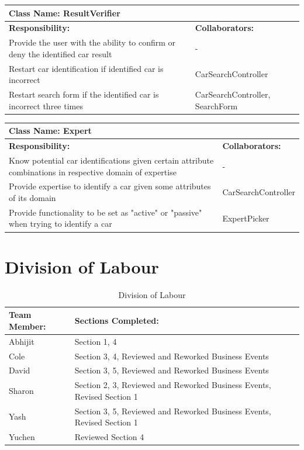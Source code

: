 \documentclass[12pt]{article}
\begin{document}
	\begin{table}[ht]
		\centering
		\begin{tabular}{|p{5cm}|p{5cm}|}
			\hline
			\multicolumn{2}{|l|}{\textbf{Class Name:} ResultVerifier} \\
			\hline
			\textbf{Responsibility:} & \textbf{Collaborators:} \\
			\hline
			Provide the user with the ability to confirm or deny the identified car result & -\\
			\hline
			Restart car identification if identified car is incorrect & CarSearchController\\
			\hline
			Restart search form if the identified car is incorrect three times & CarSearchController, SearchForm\\
			\hline
		\end{tabular}
	\end{table}

	\begin{table}[ht]
		\centering
		\begin{tabular}{|p{5cm}|p{5cm}|}
			\hline
			\multicolumn{2}{|l|}{\textbf{Class Name:} Expert} \\
			\hline
			\textbf{Responsibility:} & \textbf{Collaborators:} \\
			\hline
			Know potential car identifications given certain attribute combinations in respective domain of expertise & -\\
			\hline
			Provide expertise to identify a car given some attributes of its domain & CarSearchController\\
			\hline
			Provide functionality to be set as "active" or "passive" when trying to identify a car & ExpertPicker\\
			\hline
		\end{tabular}
	\end{table}

\FloatBarrier
\appendix
\section{Division of Labour}
\label{sec:division_of_labour}
\begin{table}[ht]
	\centering
	\begin{tabular}{|p{5cm}|p{5cm}|}
		\hline
		\textbf{Team Member:} & \textbf{Sections Completed:}\\
		\hline
		Abhijit & Section 1, 4\\
		\hline
		Cole & Section 3, 4, Reviewed and Reworked Business Events\\
		\hline
		David & Section 3, 5, Reviewed and Reworked Business Events\\
		\hline
		Sharon & Section 2, 3, Reviewed and Reworked Business Events, Revised Section 1\\
		\hline
		Yash & Section 3, 5, Reviewed and Reworked Business Events, Revised Section 1\\
		\hline
		Yuchen & Reviewed Section 4\\
		\hline
	\end{tabular}
	\caption{Division of Labour}
	\label{table:1}
\end{table}
\end{document}
